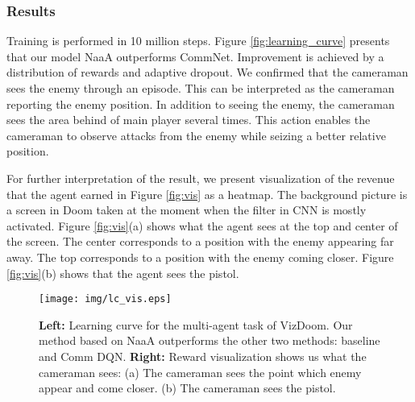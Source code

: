 \subsubsection{Results}
Training is performed in 10 million steps.
Figure \ref{fig:learning_curve} presents that our model NaaA outperforms CommNet.
Improvement is achieved by a distribution of rewards and adaptive dropout.
We confirmed that the cameraman sees the enemy through an episode.
This can be interpreted as the cameraman reporting the enemy position.
In addition to seeing the enemy, the cameraman sees the area behind of main player several times.
This action enables the cameraman to observe attacks from the enemy while seizing a better relative position.

For further interpretation of the result, 
we present visualization of the revenue that the agent earned in Figure \ref{fig:vis} as a heatmap.
The background picture is a screen in Doom taken at the moment when the filter in CNN is mostly activated.
Figure \ref{fig:vis}(a) shows what the agent sees at the top and center of the screen.
The center corresponds to a position with the enemy appearing far away.
The top corresponds to a position with the enemy coming closer.
Figure \ref{fig:vis}(b) shows that the agent sees the pistol.

%
\begin{figure*}[t]
\centering
\texttt{[image: img/lc\_vis.eps]}
\caption{
	\textbf{Left:}
		Learning curve for the multi-agent task of VizDoom. 
		Our method based on NaaA outperforms the other two methods: baseline and Comm DQN.
	\textbf{Right:} 
		Reward visualization shows us what the cameraman sees:
		(a) The cameraman sees the point which enemy appear and come closer.
		(b) The cameraman sees the pistol.
}
\label{fig:double}
\end{figure*}


